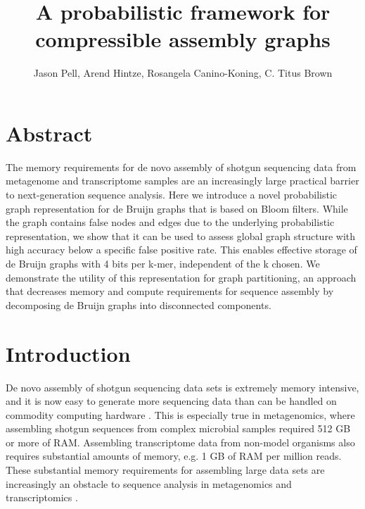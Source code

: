 \documentclass[12pt]{article} \usepackage{simplemargins}
\begin{document}
\title{A probabilistic framework for compressible assembly graphs}
\author{Jason Pell, Arend Hintze, Rosangela Canino-Koning, C. Titus Brown}

\maketitle

\section{Abstract}

The memory requirements for de novo assembly of shotgun sequencing
data from metagenome and transcriptome samples are an increasingly
large practical barrier to next-generation sequence analysis.  Here we
introduce a novel probabilistic graph representation for de Bruijn
graphs that is based on Bloom filters.  While the graph contains false nodes and
edges due to the underlying probabilistic representation, we show that
it can be used to assess global graph structure with high accuracy
below a specific false positive rate.
This enables effective storage of de Bruijn graphs with 4 bits per k-mer,
independent of the k chosen.
We demonstrate the
utility of this representation for graph partitioning, an approach
that decreases memory and compute requirements for sequence assembly
by decomposing de Bruijn graphs into disconnected components.

\section{Introduction}

De novo assembly of shotgun sequencing data sets is extremely memory
intensive, and it is now easy to generate more sequencing data than
can be handled on commodity computing hardware \cite{pubmed21310981}.  This is especially
true in metagenomics, where assembling shotgun sequences
from complex microbial samples required 512 GB or more of 
RAM\cite{pmid20203603, pmid21273488}.  Assembling transcriptome data from non-model
organisms also requires substantial amounts of memory, e.g. 1 GB of
RAM per million reads\cite{trinity}.  These substantial memory requirements for
assembling large data sets are increasingly an obstacle to
sequence analysis in metagenomics and transcriptomics \cite{trinity,pubmed21310981,pubmed21304727}.
\end{document}

